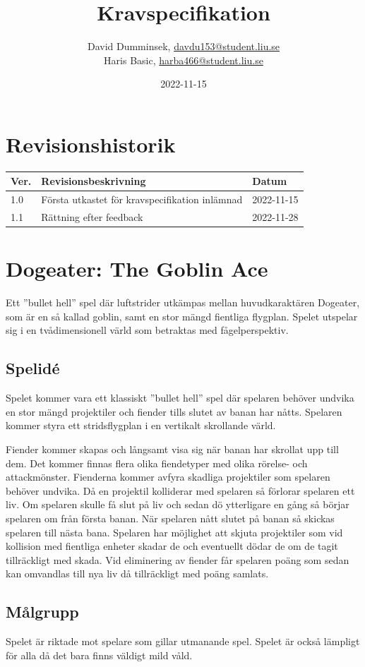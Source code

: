 \documentclass{TDP005mall}
\author{David Dumminsek, \url{davdu153@student.liu.se}\\
  Haris Basic, \url{harba466@student.liu.se}\\
  }
\title{Kravspecifikation}
\date{2022-11-15}
\begin{document}
\projectpage
\section{Revisionshistorik}
\begin{table}[!h]
\begin{tabularx}{\linewidth}{|l|X|l|}
\hline
Ver. & Revisionsbeskrivning & Datum \\\hline
1.0 & Första utkastet för kravspecifikation inlämnad & 2022-11-15 \\\hline
1.1 & Rättning efter feedback & 2022-11-28 \\\hline
\end{tabularx}
\end{table}
\tableofcontents
\clearpage
\section{Dogeater: The Goblin Ace}

Ett ''bullet hell'' spel där luftstrider utkämpas mellan huvudkaraktären Dogeater, som är en så kallad goblin, samt en stor mängd fientliga flygplan.
Spelet utspelar sig i en tvådimensionell värld som betraktas med fågelperspektiv.

\subsection{Spelidé}
Spelet kommer vara ett klassiskt ''bullet hell'' spel där spelaren behöver undvika en stor mängd projektiler och fiender tills slutet av banan har nåtts. 
Spelaren kommer styra ett stridsflygplan i en vertikalt skrollande värld.

Fiender kommer skapas och långsamt visa sig när banan har skrollat upp till dem. Det kommer finnas flera olika fiendetyper med olika rörelse- och attackmönster. 
Fienderna kommer avfyra skadliga projektiler som spelaren behöver undvika. Då en projektil kolliderar med spelaren så förlorar spelaren ett liv.
Om spelaren skulle få slut på liv och sedan dö ytterligare en gång så börjar spelaren om från första banan.
När spelaren nått slutet på banan så skickas spelaren till nästa bana.
Spelaren har möjlighet att skjuta projektiler som vid kollision med fientliga enheter skadar de och eventuellt dödar de om de tagit tillräckligt med skada.
Vid eliminering av fiender får spelaren poäng som sedan kan omvandlas till nya liv då tillräckligt med poäng samlats.

\subsection{Målgrupp}
Spelet är riktade mot spelare som gillar utmanande spel.
Spelet är också lämpligt för alla då det bara finns väldigt mild våld.
\end{document}
